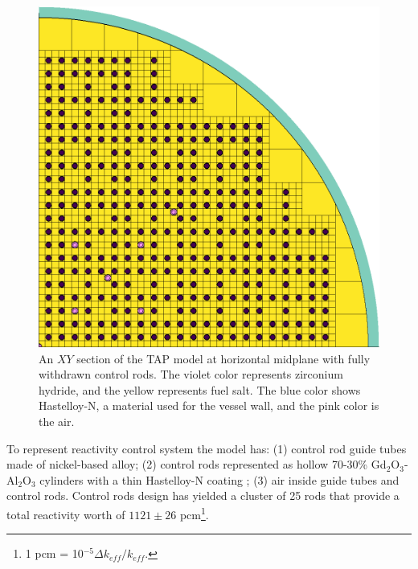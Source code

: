 \documentclass{anstrans}
\begin{document}
\begin{figure}[htp!] %
	\centering
	\includegraphics[width=\linewidth]{tap_plan_view.png}
	\caption{An $XY$ section of the \gls{TAP} model at horizontal midplane 
		with fully withdrawn control rods. The violet color represents 
		zirconium hydride, and the yellow represents fuel salt. The blue color 
		shows Hastelloy-N, a material used for the vessel wall, and the pink 
		color is the air.}
	\label{fig:tap-serpent-plan}
\end{figure}

To represent reactivity control system the 
model has: (1) control rod guide tubes made of nickel-based alloy; (2) control 
rods represented as hollow 70-30\% Gd$_2$O$_3$-Al$_2$O$_3$ cylinders with a 
thin Hastelloy-N coating \cite{betzler_assessment_2017}; (3) air inside guide 
tubes and control rods. Control rods design has yielded a cluster of 25 rods 
that provide a total reactivity worth of $1121\pm26$ pcm\footnote{ 1 pcm = 
10$^{-5}\Delta k_{eff}/k_{eff}$.}.
\end{document}
